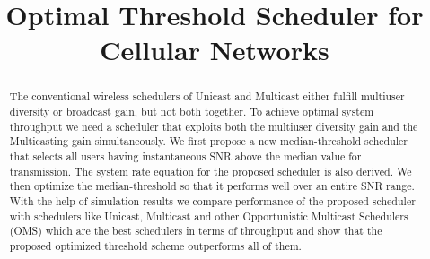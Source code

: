 \documentclass[conference]{IEEEtran}
\begin{document}
\title{Optimal Threshold Scheduler for Cellular Networks }


\author{
\and
{}
}













\maketitle


\begin{abstract}
The conventional wireless schedulers of Unicast and Multicast either fulfill multiuser diversity or broadcast gain, but not both together. To achieve optimal system throughput we need a scheduler that exploits both the multiuser diversity gain and the Multicasting gain simultaneously. We first propose a new median-threshold scheduler that selects all users having instantaneous SNR above the median value for transmission. The system rate equation for the proposed scheduler is also derived. We then optimize the median-threshold so that it performs well over an entire SNR range. With the help of simulation results we compare performance of the proposed scheduler with schedulers like Unicast, Multicast and other Opportunistic Multicast Schedulers (OMS) which are the best schedulers in terms of throughput and show that the proposed optimized threshold scheme outperforms all of them. 
\end{abstract}







\IEEEpeerreviewmaketitle
\end{document}
